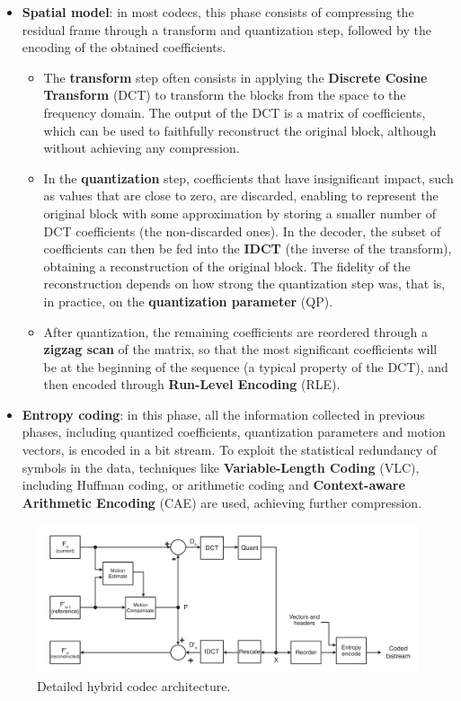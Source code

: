 \begin{itemize}
    \item \textbf{Spatial model}: in most codecs, this phase consists of compressing the residual frame through a transform and quantization step, followed by the encoding of the obtained coefficients.
        \begin{itemize}
            \item The \textbf{transform} step often consists in applying the \textbf{Discrete Cosine Transform} (DCT) to transform the blocks from the space to the frequency domain. The output of the DCT is a matrix of coefficients, which can be used to faithfully reconstruct the original block, although without achieving any compression.
            \item In the \textbf{quantization} step, coefficients that have insignificant impact, such as values that are close to zero, are discarded, enabling to represent the original block with some approximation by storing a smaller number of DCT coefficients (the non-discarded ones). In the decoder, the subset of coefficients can then be fed into the \textbf{IDCT} (the inverse of the transform), obtaining a reconstruction of the original block. The fidelity of the reconstruction depends on how strong the quantization step was, that is, in practice, on the \textbf{quantization parameter} (QP).
            \item After quantization, the remaining coefficients are reordered through a \textbf{zigzag scan} of the matrix, so that the most significant coefficients will be at the beginning of the sequence (a typical property of the DCT), and then encoded through \textbf{Run-Level Encoding} (RLE).
        \end{itemize}
     
    \item \textbf{Entropy coding}: in this phase, all the information collected in previous phases, including quantized coefficients, quantization parameters and motion vectors, is encoded in a bit stream. To exploit the statistical redundancy of symbols in the data, techniques like \textbf{Variable-Length Coding} (VLC), including Huffman coding, or arithmetic coding and \textbf{Context-aware Arithmetic Encoding} (CAE) are used, achieving further compression.
\end{itemize}

\begin{figure}[hb]
	\centering
	
	\includegraphics[width=\textwidth]{res/hybrid_codec_detailed.png}
	
	\caption{Detailed hybrid codec architecture.\cite{h264}}
	\label{fig:codec_detailed}
\end{figure}

